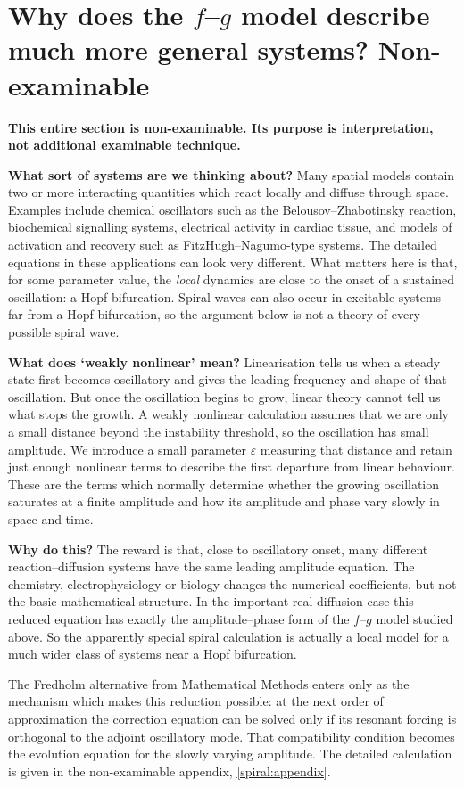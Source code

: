 \documentclass[main.tex]{subfiles}
\begin{document}
\section{Why does the $f$--$g$ model describe much more general systems? Non-examinable}\label{spiral:shortfredholm}
\begin{nem}
\textbf{This entire section is non-examinable.  Its purpose is interpretation, not additional examinable technique.}

\medskip
\textbf{What sort of systems are we thinking about?}  Many spatial models contain two or more interacting quantities which react locally and diffuse through space.  Examples include chemical oscillators such as the Belousov--Zhabotinsky reaction, biochemical signalling systems, electrical activity in cardiac tissue, and models of activation and recovery such as FitzHugh--Nagumo-type systems.  The detailed equations in these applications can look very different.  What matters here is that, for some parameter value, the \emph{local} dynamics are close to the onset of a sustained oscillation: a Hopf bifurcation.  Spiral waves can also occur in excitable systems far from a Hopf bifurcation, so the argument below is not a theory of every possible spiral wave.

\medskip
\textbf{What does `weakly nonlinear' mean?}  Linearisation tells us when a steady state first becomes oscillatory and gives the leading frequency and shape of that oscillation.  But once the oscillation begins to grow, linear theory cannot tell us what stops the growth.  A weakly nonlinear calculation assumes that we are only a small distance beyond the instability threshold, so the oscillation has small amplitude.  We introduce a small parameter $\varepsilon$ measuring that distance and retain just enough nonlinear terms to describe the first departure from linear behaviour.  These are the terms which normally determine whether the growing oscillation saturates at a finite amplitude and how its amplitude and phase vary slowly in space and time.

\medskip
\textbf{Why do this?}  The reward is that, close to oscillatory onset, many different reaction--diffusion systems have the same leading amplitude equation.  The chemistry, electrophysiology or biology changes the numerical coefficients, but not the basic mathematical structure.  In the important real-diffusion case this reduced equation has exactly the amplitude--phase form of the $f$--$g$ model studied above.  So the apparently special spiral calculation is actually a local model for a much wider class of systems near a Hopf bifurcation.

\medskip
The Fredholm alternative from Mathematical Methods enters only as the mechanism which makes this reduction possible: at the next order of approximation the correction equation can be solved only if its resonant forcing is orthogonal to the adjoint oscillatory mode.  That compatibility condition becomes the evolution equation for the slowly varying amplitude.  The detailed calculation is given in the non-examinable appendix, \cref{spiral:appendix}.
\end{nem}
\end{document}
